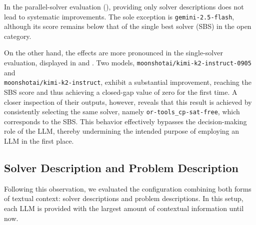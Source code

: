 \documentclass[../../main]{subfiles}
\begin{document}
In the parallel-solver evaluation (), providing only solver descriptions does not lead to systematic improvements. The sole exception is \texttt{gemini-2.5-flash}, although its score remains below that of the single best solver (SBS) in the open category.

On the other hand, the effects are more pronounced in the single-solver evaluation, displayed in  and . Two models, \texttt{moonshotai/kimi-k2-instruct-0905} and \\\texttt{moonshotai/kimi-k2-instruct}, exhibit a substantial improvement, reaching the SBS score and thus achieving a closed-gap value of zero for the first time. A closer inspection of their outputs, however, reveals that this result is achieved by consistently selecting the same solver, namely \texttt{or-tools\_cp-sat-free}, which corresponds to the SBS. This behavior effectively bypasses the decision-making role of the LLM, thereby undermining the intended purpose of employing an LLM in the first place.

\subsection{Solver Description and Problem Description}
\label{sec:SdescPdesc}
Following this observation, we evaluated the configuration combining both forms of textual context: solver descriptions and problem descriptions. In this setup, each LLM is provided with the largest amount of contextual information until now.

\begin{table}[!ht]
    \centering
    \caption{Test with sanitized scripts combined with both solvers description, and problem description in a multi turn setup. Columns are calculated as in .}
    \label{tab:combinedsDescpDesc}
\end{table}
\end{document}
